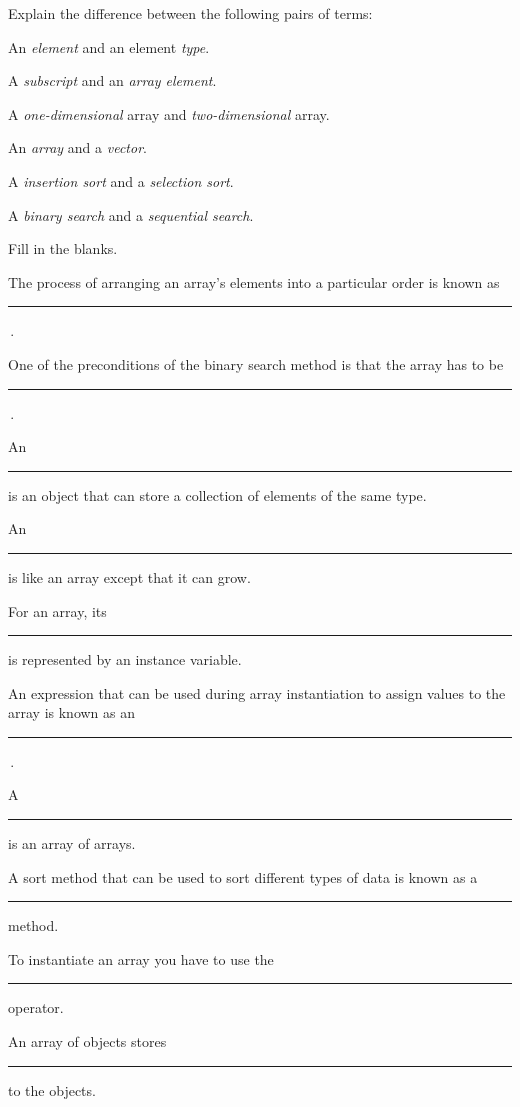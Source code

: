 \begin{EXRtwo}

\item  Explain the difference between the following
pairs of terms:

\begin{EXRtwoLL}
\item  An {\it element} and an element {\it type}.
\item  A {\it subscript} and an {\it array element}.
\item  A {\it one-dimensional} array and {\it two-dimensional} array.
\item  An {\it array} and a {\it vector}.
\item  A {\it insertion sort} and a {\it selection sort}.
\item  A {\it binary search} and a {\it sequential search}.
\end{EXRtwoLL}

\item  Fill in the blanks.
\begin{EXRtwoLL}\baselineskip=14pt
\item  The process of arranging an array's elements into a
particular order is known as  \rule{40pt}{0.5pt}\,.
\item  One of the preconditions of the binary search method is that
the array has to be  \rule{40pt}{0.5pt}\,.
\item  An \rule{40pt}{0.5pt} is an object that can store a collection
of elements of the same type.
\item  An \rule{40pt}{0.5pt} is like an array except that it can grow.
\item  For an array, its  \rule{40pt}{0.5pt} is represented by an instance
variable.
\item  An expression that can be used during array instantiation to assign
values to the array is known as an  \rule{40pt}{0.5pt}\,.
\item  A \rule{40pt}{0.5pt} is an array of arrays.
\item  A sort method that can be used to sort different types of data
is known as a \rule{40pt}{0.5pt} method.
\item  To instantiate an array you have to use the \rule{40pt}{0.5pt} operator.
\item  An array of objects stores \rule{40pt}{0.5pt} to the objects.
\end{EXRtwoLL}


\end{EXRtwo}
